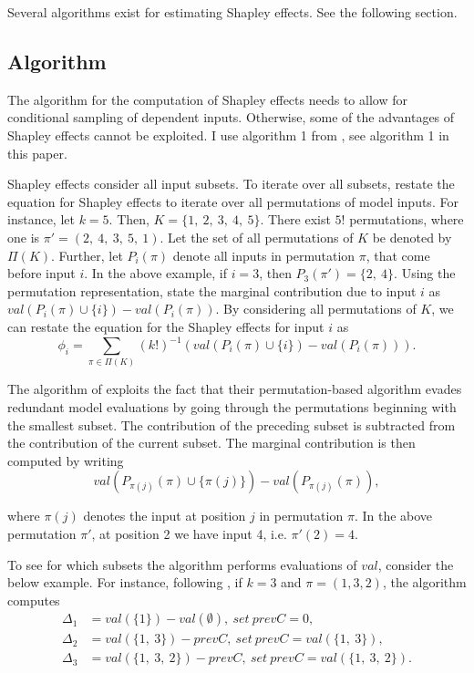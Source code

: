Several algorithms exist for estimating Shapley effects. See the following section.

\subsection{Algorithm} \label{comp_alg}

The algorithm for the computation of Shapley effects needs to allow for conditional sampling of dependent inputs. Otherwise, some of the advantages of Shapley effects cannot be exploited. I use algorithm 1 from \citet{SNS16}, see algorithm 1 in this paper.

Shapley effects consider all input subsets. To iterate over all subsets, \citet{SNS16} restate the equation for Shapley effects to iterate over all permutations of model inputs. For instance, let $k=5$. Then, $K=\{1,\ 2,\ 3,\ 4,\ 5\}$. There exist $5!$ permutations, where one is $\pi'=(2,\ 4,\ 3,\ 5,\ 1)$. Let the set of all permutations of $K$ be denoted by $\Pi(K)$. Further, let $P_i(\pi)$ denote all inputs in permutation $\pi$, that come before input $i$. In the above example, if $i=3$, then $P_3(\pi')=\{2,\ 4\}$. Using the permutation representation, \citet{SNS16} state the marginal contribution due to input $i$ as $val(P_i(\pi) \cup\{i\}) - val(P_i(\pi))$. By considering all permutations of $K$, we can restate the equation for the Shapley effects for input $i$ as
\begin{equation}
\phi_i=\sum_{\pi \in \Pi(K)} (k!)^{-1} (val(P_i(\pi) \cup\{i\}) - val(P_i(\pi))).
\end{equation}

The algorithm of \citet{SNS16} exploits the fact that their permutation-based algorithm evades redundant model evaluations by going through the permutations beginning with the smallest subset. The contribution of the preceding subset is subtracted from the contribution of the current subset. The marginal contribution is then computed by writing
\begin{equation}
val(P_{\pi(j)}(\pi) \cup \{\pi(j)\}) - val(P_{\pi(j)}(\pi)),
\end{equation}

\noindent where $\pi(j)$ denotes the input at position $j$ in permutation $\pi$. In the above permutation $\pi'$, at position 2 we have input 4, i.e. $\pi'(2)=4$.

To see for which subsets the algorithm performs evaluations of $val$, consider the below example. For instance, following \citet{SNS16}, if $k=3$ and $\pi=(1, 3, 2)$, the algorithm computes
\begin{align*}
\Delta_1 &=val(\{1\})-val(\emptyset),\ set\ prevC=0, \\
\Delta_2 &=val(\{1,\ 3\})-prevC,\ set\ prevC=val(\{1,\ 3\}), \\
\Delta_3 &=val(\{1,\ 3,\ 2\})-prevC,\ set\ prevC=val(\{1,\ 3,\ 2\}).
\end{align*}

